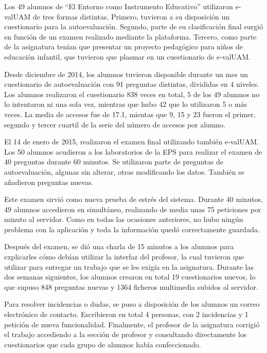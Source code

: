 Los 49 alumnos de ``El Entorno como Instrumento Educativo'' utilizaron e-valUAM de tres formas distintas. Primero, tuvieron a su disposición un cuestionario para la autoevaluación. Segundo, parte de su clasificación final surgió en función de un examen realizado mediante la plataforma. Tercero, como parte de la asignatura tenían que presentar un proyecto pedagógico para niños de educación infantil, que tuvieron que plasmar en un cuestionario de e-valUAM. 

Desde diciembre de 2014, los alumnos tuvieron disponible durante un mes un cuestionario de autoevaluación con 91 preguntas distintas, divididas en 4 niveles. Los alumnos realizaron el cuestionario 838 veces en total, 5 de los 49 alumnos no lo intentaron ni una sola vez, mientras que hubo 42 que lo utilizaron 5 o más veces. La media de accesos fue de 17.1, mientas que 9, 15 y 23 fueron el primer, segundo y tercer cuartil de la serie del número de accesos por alumno.

El 14 de enero de 2015, realizaron el examen final utilizando también e-valUAM. Los 50 alumnos acudieron a los laboratorios de la EPS para realizar el examen de 40 preguntas durante 60 minutos. Se utilizaron parte de preguntas de autoevaluación, algunas sin alterar, otras modificando los datos. También se añadieron preguntas nuevas.

Este examen sirvió como nueva prueba de estrés del sistema. Durante 40 minutos, 49 alumnos accedieron en simultáneo, realizando de media unas 75 peticiones por minuto al servidor. Como en todas las ocasiones anteriores, no hubo ningún problema con la aplicación y toda la información quedó correctamente guardada.

Después del examen, se dió una charla de 15 minutos a los alumnos para explicarles cómo debían utilizar la interfaz del profesor, la cual tuvieron que utilizar para entregar un trabajo que se les exigía en la asignatura. Durante las dos semanas siguientes, los alumnos crearon en total 19 cuestionarios nuevos, lo que supuso 848 preguntas nuevas y 1364 ficheros multimedia subidos al servidor. 

Para resolver incidencias o dudas, se puso a disposición de los alumnos un correo electrónico de contacto. Escribieron en total 4 personas, con 2 incidencias y 1 petición de nueva funcionalidad. Finalmente, el profesor de la asignatura corrigió el trabajo accediendo a la sección de profesor y consultando directamente los cuestionarios que cada grupo de alumnos había confeccionado.

